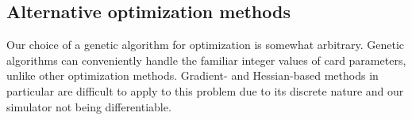 

\subsection{Alternative optimization methods}

Our choice of a genetic algorithm for optimization is somewhat arbitrary. Genetic algorithms can conveniently 
handle the familiar integer values of card parameters, unlike other optimization methods. Gradient- and Hessian-based
methods in particular are difficult to apply to this problem due to its discrete nature and our simulator not being
differentiable.

